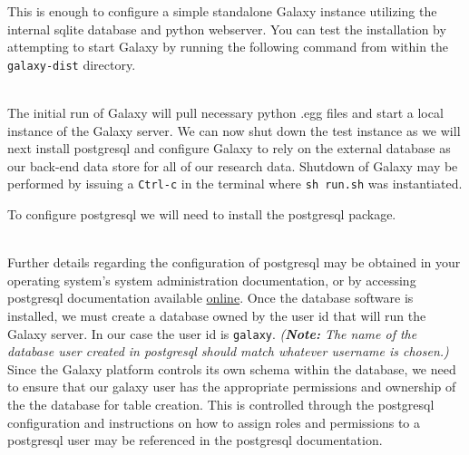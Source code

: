 \documentclass[a4paper,10pt]{article}
\begin{document}
\vspace{1em}
This is enough to configure a simple standalone Galaxy instance utilizing the internal sqlite database and python webserver.  You can test the installation by attempting to start Galaxy by running the following command from within the \texttt{galaxy-dist} directory.
\\\\

\vspace{1em}
The initial run of Galaxy will pull necessary python .egg files and start a local instance of the Galaxy server.  We can now shut down the test instance as we will next install postgresql and configure Galaxy to rely on the external database as our back-end data store for all of our research data.  Shutdown of Galaxy may be performed by issuing a \texttt{Ctrl-c} in the terminal where \texttt{sh run.sh} was instantiated.

To configure postgresql we will need to install the postgresql package.
\\\\

\vspace{1em}
Further details regarding the configuration of postgresql may be obtained in your operating system's system administration documentation, or by accessing postgresql documentation available \href{http://www.postgresql.org/}{online}.  Once the database software is installed, we must create a database owned by the user id that will run the Galaxy server.  In our case the user id is \texttt{galaxy}.  \textit{(\textbf{Note:} The name of the database user created in postgresql should match whatever username is chosen.)}  Since the Galaxy platform controls its own schema within the database, we need to ensure that our galaxy user has the appropriate permissions and ownership of the the database for table creation.  This is controlled through the postgresql configuration and instructions on how to assign roles and permissions to a postgresql user may be referenced in the postgresql documentation.
\end{document}
